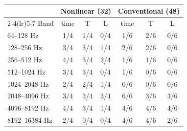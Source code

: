 \begin{tabular}{lcccccc}
\toprule
 & \multicolumn{3}{c}{Nonlinear (32)} & \multicolumn{3}{c}{Conventional (48)}\\
\cmidrule(lr){2-4}\cmidrule(lr){5-7}
Band & time & T & L & time & T & L\\
\midrule
64--128 Hz & 1/4 & 1/4 & 0/4 & 1/6 & 2/6 & 0/6\\
128--256 Hz & 3/4 & 3/4 & 1/4 & 2/6 & 2/6 & 0/6\\
256--512 Hz & 4/4 & 3/4 & 2/4 & 1/6 & 1/6 & 0/6\\
512--1024 Hz & 3/4 & 3/4 & 0/4 & 1/6 & 0/6 & 0/6\\
1024--2048 Hz & 2/4 & 2/4 & 1/4 & 0/6 & 0/6 & 0/6\\
2048--4096 Hz & 3/4 & 3/4 & 3/4 & 6/6 & 3/6 & 3/6\\
4096--8192 Hz & 4/4 & 3/4 & 1/4 & 4/6 & 4/6 & 4/6\\
8192--16384 Hz & 2/4 & 0/4 & 0/4 & 4/6 & 4/6 & 2/6\\
\bottomrule
\end{tabular}
